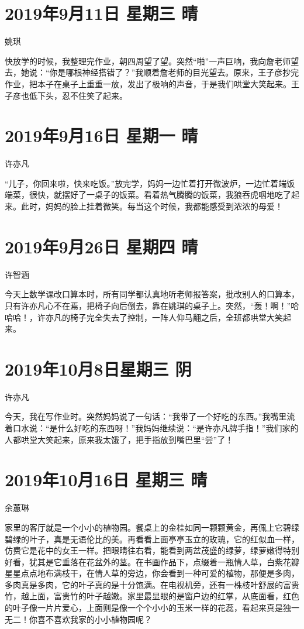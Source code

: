 \section{2019年9月11日 星期三 晴}

姚琪

快放学的时候，我整理完作业，朝四周望了望。突然``啪''一声巨响，我向詹老师望去，她说：``你是哪根神经搭错了？''我顺着詹老师的目光望去。原来，王子彦抄完作业，把本子在桌子上重重一放，发出了极响的声音，于是我们哄堂大笑起来。王子彦也低下头，忍不住笑了起来。

\section{2019年9月16日 星期一 晴}

许亦凡

``儿子，你回来啦，快来吃饭。''放完学，妈妈一边忙着打开微波炉，一边忙着端饭端菜，很快，就摆好了一桌子的饭菜。看着热气腾腾的饭菜，我狼吞虎咽地吃了起来。此时，妈妈的脸上挂着微笑。每当这个时候，我都能感受到浓浓的母爱！

\section{2019年9月26日 星期四 晴}

许智涵

今天上数学课改口算本时，所有同学都认真地听老师报答案，批改别人的口算本，只有许亦凡心不在焉，把椅子向后倒去，靠在姚琪的桌子上。突然，``轰！啊！''哈哈哈！，许亦凡的椅子完全失去了控制，一阵人仰马翻之后，全班都哄堂大笑起来。

\section{2019年10月8日星期三 阴}

许亦凡

今天，我在写作业时。突然妈妈说了一句话：``我带了一个好吃的东西。''我嘴里流着口水说：``是什么好吃的东西呀！''我妈妈继续说：``是许亦凡牌手指！''我们家的人都哄堂大笑起来，原来我太饿了，把手指放到嘴巴里``尝''了！

\section{2019年10月16日 星期三 晴}

余蕙琳

家里的客厅就是一个小小的植物园。餐桌上的金桂如同一颗颗黄金，再佩上它碧绿碧绿的叶子，真是无语伦比的美。再看看上面亭亭玉立的玫瑰，它的红似血一样，仿费它是花中的女王一样。把眼睛往右看，能看到两盆茂盛的绿萝，绿萝嫩得特别好看，犹其是它垂落在花盆外的茎。在书画作品下，点缀着一瓶情人草，白紫花瓣星星点点地布满枝干，在情人草的旁边，你会看到一种可爱的植物，那便是多肉，多肉真是多肉，它的叶子真的是十分饱满。在电视机旁，还有一株枝叶舒展的富贵竹，越上面，富贵竹的叶子越嫩。家里最显眼的是窗户边的红掌，从底面看，红色的叶子像一片片爱心，上面则是像一个个小小的玉米一样的花蕊，看起来真是独一无二！你喜不喜欢我家的小小植物园呢？

